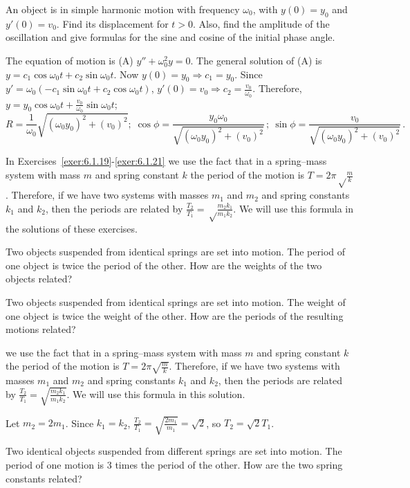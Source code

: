 \documentclass{ximera}
\begin{document}
\begin{problem}\label{exer:6.1.18}
An object is in simple harmonic motion
with frequency $\omega_0$, with $y(0)=y_0$ and $y'(0)=v_0$. Find
its displacement for $t>0$. Also, find the amplitude of the
oscillation and give formulas for the sine and cosine of the initial
phase angle.

\begin{solution}
    The equation of motion is (A) $y''+\omega_0^2y=0$. The general
solution of (A) is $y=c_1\cos\omega_0t+c_2\sin\omega_0t$.
Now $y(0)=y_0\Rightarrow c_1=y_0$. Since
 $y'=\omega_0(-c_1\sin\omega_0t+c_2\cos\omega_0t)$,
$y'(0)=v_0\Rightarrow c_2=\frac{v_0}{\omega_0}$. Therefore,
$y=y_0\cos\omega_0 t+\frac{v_0}{\omega_0}\sin\omega_0t$;
$$
R=\frac{1}{\omega_0} \sqrt{(\omega_0y_0)^2+(v_0)^2};\;
\cos\phi=\frac{y_0\omega_0}{
\sqrt{(\omega_0y_0)^2+(v_0)^2}}\,;\ \sin\phi=\frac{v_0}{
\sqrt{(\omega_0y_0)^2+(v_0)^2}}\,.
$$
\end{solution}
\end{problem}

\begin{remark}
    In Exercises~\ref{exer:6.1.19}-\ref{exer:6.1.21} we use
the fact that in a spring--mass system with mass $m$ and spring
constant $k$ the period of the motion is $T=2\pi\sqrt\frac{m}{
k}$. Therefore, if we have two systems with masses $m_1$ and $m_2$
and spring constants $k_1$ and $k_2$, then the periods are related by
$\frac{T_2}{ T_1}=\sqrt\frac{m_2k_1}{ m_1k_2}$. We will use this
formula in the solutions of these exercises.
\end{remark}

\begin{problem}\label{exer:6.1.19}
Two objects suspended from identical springs are set into
motion.  The period of one object is twice the period of the other.
How are the weights of the two objects related?
\end{problem}

\begin{problem}\label{exer:6.1.20}
Two objects suspended from identical springs are set into motion. The
weight of one object is twice the weight of the other. How are the
periods of the resulting motions related?

\begin{solution}
we use
the fact that in a spring--mass system with mass $m$ and spring
constant $k$ the period of the motion is $T=2\pi\sqrt{\frac{m}{k}}$. Therefore, if we have two systems with masses $m_1$ and $m_2$
and spring constants $k_1$ and $k_2$, then the periods are related by
$\frac{T_2}{T_1}=\sqrt{\frac{m_2k_1}{m_1k_2}}$. We will use this
formula in this solution.

Let $m_2=2m_1$. Since $k_1=k_2$, $\frac{T_2}{T_1} =\sqrt{\frac{2m_1}{m_1}} =\sqrt2$, so $T_2=\sqrt2T_1$.

\end{solution}
\end{problem}

\begin{problem}\label{exer:6.1.21}
Two identical objects suspended from different springs are set into
motion. The period of one motion is 3 times the period of the
other. How are the two spring constants related?
\end{problem}
\end{document}
